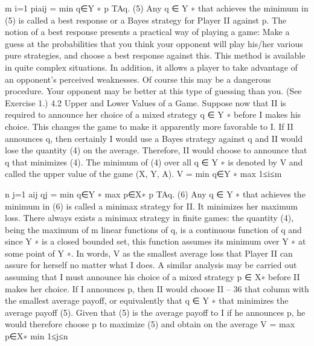 m
i=1
piaij = min
q∈Y ∗ p
TAq. (5)
Any q ∈ Y ∗ that achieves the minimum in (5) is called a best response or a Bayes strategy
for Player II against p.
The notion of a best response presents a practical way of playing a game: Make a
guess at the probabilities that you think your opponent will play his/her various pure
strategies, and choose a best response against this. This method is available in quite
complex situations. In addition, it allows a player to take advantage of an opponent’s
perceived weaknesses. Of course this may be a dangerous procedure. Your opponent may
be better at this type of guessing than you. (See Exercise 1.)
4.2 Upper and Lower Values of a Game. Suppose now that II is required to
announce her choice of a mixed strategy q ∈ Y ∗ before I makes his choice. This changes
the game to make it apparently more favorable to I. If II announces q, then certainly I
would use a Bayes strategy against q and II would lose the quantity (4) on the average.
Therefore, II would choose to announce that q that minimizes (4). The minimum of (4)
over all q ∈ Y ∗ is denoted by V and called the upper value of the game (X, Y, A).
V = min
q∈Y ∗ max
1≤i≤m

n
j=1
aij qj = min
q∈Y ∗ max
p∈X∗ p
TAq. (6)
Any q ∈ Y ∗ that achieves the minimum in (6) is called a minimax strategy for II. It
minimizes her maximum loss. There always exists a minimax strategy in finite games: the
quantity (4), being the maximum of m linear functions of q, is a continuous function of q
and since Y ∗ is a closed bounded set, this function assumes its minimum over Y ∗ at some
point of Y ∗.
In words, V as the smallest average loss that Player II can assure for herself no matter
what I does.
A similar analysis may be carried out assuming that I must announce his choice of a
mixed strategy p ∈ X∗ before II makes her choice. If I announces p, then II would choose
II – 36
that column with the smallest average payoff, or equivalently that q ∈ Y ∗ that minimizes
the average payoff (5). Given that (5) is the average payoff to I if he announces p, he
would therefore choose p to maximize (5) and obtain on the average
V = max
p∈X∗ min
1≤j≤n

